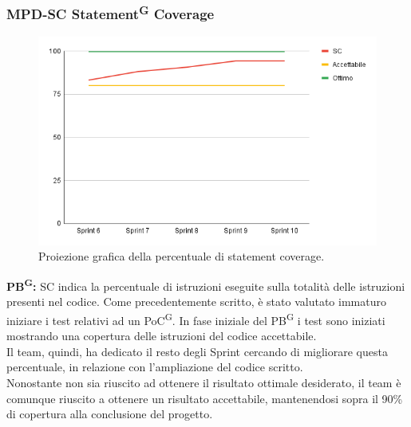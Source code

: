 \documentclass[8pt]{article}
\newcommand{\glossterm}[1]{#1\textsuperscript{G}} %
\begin{document}
\subsubsection{MPD-SC \glossterm{Statement} Coverage}
\begin{figure}[h!]
    \centering
    \includegraphics[width=1\textwidth]{images_pdq/SC.png}
    \caption{Proiezione grafica della percentuale di statement coverage.}
    \label{fig:Proiezione grafica della percentuale di statement coverage}
\end{figure}
\textbf{\glossterm{PB}:} SC indica la percentuale di istruzioni eseguite sulla totalità delle istruzioni presenti nel codice. Come precedentemente scritto, è stato valutato immaturo iniziare i test relativi ad un \glossterm{PoC}. In fase iniziale del \glossterm{PB} i test sono iniziati mostrando una copertura delle istruzioni del codice accettabile. \\ Il team, quindi, ha dedicato il resto degli Sprint cercando di migliorare questa percentuale, in relazione con l'ampliazione del codice scritto. \\ Nonostante non sia riuscito ad ottenere il risultato ottimale desiderato, il team è comunque riuscito a ottenere un risultato accettabile, mantenendosi sopra il 90\% di copertura alla conclusione del progetto.
\clearpage
\end{document}
